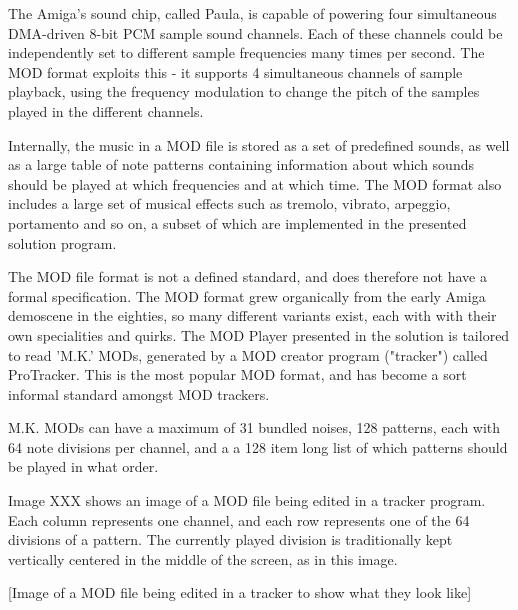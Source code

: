 The Amiga's sound chip, called Paula, is capable of powering four simultaneous DMA-driven 8-bit PCM sample sound channels.
Each of these channels could be independently set to different sample frequencies many times per second.
The MOD format exploits this - it supports 4 simultaneous channels of sample playback, using the frequency modulation to change the pitch of the samples played in the different channels.

Internally, the music in a MOD file is stored as a set of predefined sounds, as well as a large table of note patterns containing information about which sounds should be played at which frequencies and at which time.
The MOD format also includes a large set of musical effects such as tremolo, vibrato, arpeggio, portamento and so on, a subset of which are implemented in the presented solution program.

The MOD file format is not a defined standard, and does therefore not have a formal specification.
The MOD format grew organically from the early Amiga demoscene in the eighties, so many different variants exist, each with with their own specialities and quirks.
The MOD Player presented in the solution is tailored to read 'M.K.' MODs, generated by a MOD creator program ("tracker") called ProTracker.
This is the most popular MOD format, and has become a sort informal standard amongst MOD trackers.

M.K. MODs can have a maximum of 31 bundled noises, 128 patterns, each with 64 note divisions per channel, and a a 128 item long list of which patterns should be played in what order.

Image XXX shows an image of a MOD file being edited in a tracker program.
Each column represents one channel, and each row represents one of the 64 divisions of a pattern.
The currently played division is traditionally kept vertically centered in the middle of the screen, as in this image.

[Image of a MOD file being edited in a tracker to show what they look like]
